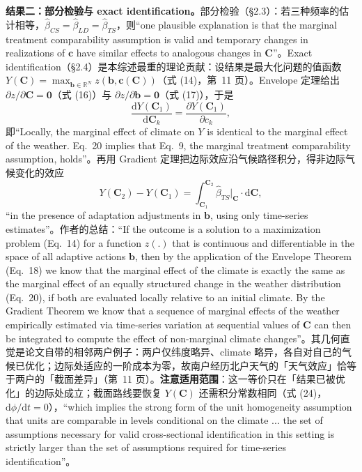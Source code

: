 \textbf{结果二：部分检验与 exact identification。}部分检验（\S 2.3）：若三种频率的估计相等，$\hat\beta_{CS}=\hat\beta_{LD}=\hat\beta_{TS}$，则``one plausible explanation is that the marginal treatment comparability assumption is valid and temporary changes in realizations of $\mathbf{c}$ have similar effects to analogous changes in $\mathbf{C}$''\citep[第~9 页]{hsiang2016climate}。Exact identification（\S 2.4）是本综述最重的理论贡献：设结果是最大化问题的值函数 $Y(\mathbf{C}) = \max_{\mathbf{b}\in\mathbb{R}^N} z(\mathbf{b}, \mathbf{c}(\mathbf{C}))$（式 (14)，第~11 页）。Envelope 定理给出 $\partial z/\partial\mathbf{C}=\mathbf{0}$（式 (16)）与 $\partial z/\partial\mathbf{b}=\mathbf{0}$（式 (17)），于是
\begin{equation*}
\frac{\mathrm{d}Y(\mathbf{C}_1)}{\mathrm{d}\mathbf{C}_k} = \frac{\partial Y(\mathbf{C}_1)}{\partial c_k} ,
\end{equation*}
即``Locally, the marginal effect of climate on $Y$ is identical to the marginal effect of the weather. Eq.~20 implies that Eq.~9, the marginal treatment comparability assumption, holds''\citep[式 (20) 及引文，第~13 页]{hsiang2016climate}。再用 Gradient 定理把边际效应沿气候路径积分，得非边际气候变化的效应
\begin{equation}
Y(\mathbf{C}_2) - Y(\mathbf{C}_1) = \int_{\mathbf{C}_1}^{\mathbf{C}_2} \hat\beta_{TS}\big|_{\mathbf{C}} \cdot \mathrm{d}\mathbf{C} ,
\label{eq:hs-integral}
\end{equation}
``in the presence of adaptation adjustments in $\mathbf{b}$, using only time-series estimates''\citep[式 (23) 及引文，第~14 页]{hsiang2016climate}。作者的总结：``If the outcome is a solution to a maximization problem (Eq.~14) for a function $z(.)$ that is continuous and differentiable in the space of all adaptive actions $\mathbf{b}$, then by the application of the Envelope Theorem (Eq.~18) we know that the marginal effect of the climate is exactly the same as the marginal effect of an equally structured change in the weather distribution (Eq.~20), if both are evaluated locally relative to an initial climate. By the Gradient Theorem we know that a sequence of marginal effects of the weather empirically estimated via time-series variation at sequential values of $\mathbf{C}$ can then be integrated to compute the effect of non-marginal climate changes''\citep[第~14 页]{hsiang2016climate}。其几何直觉是论文自带的相邻两户例子：两户仅纬度略异、climate 略异，各自对自己的气候已优化；边际处适应的一阶成本为零，故南户经历北户天气的「天气效应」恰等于两户的「截面差异」（第~11 页）。\textbf{注意适用范围}：这一等价只在「结果已被优化」的边际处成立；截面路线要恢复 $Y(\mathbf{C})$ 还需积分常数相同（式 (24)，$\mathrm{d}\phi/\mathrm{d}t=0$），``which implies the strong form of the unit homogeneity assumption that units are comparable in levels conditional on the climate ... the set of assumptions necessary for valid cross-sectional identification in this setting is strictly larger than the set of assumptions required for time-series identification''\citep[第~14 页]{hsiang2016climate}。

